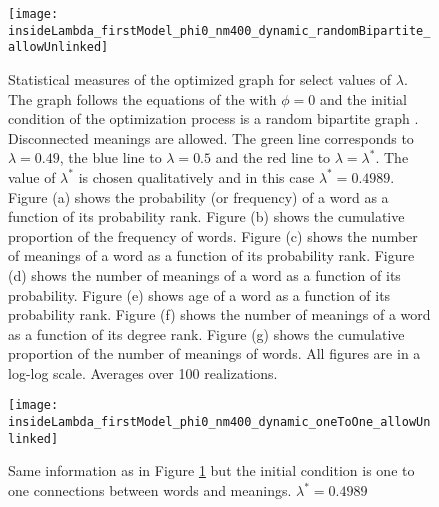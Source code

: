 \begin{figure}
  \centering
  \texttt{[image: insideLambda\_firstModel\_phi0\_nm400\_dynamic\_randomBipartite\_allowUnlinked]}
  \caption{
    Statistical measures of the optimized graph for select values of $\lambda$.
    The graph follows the equations of the \firstmodel{} with $\phi=0$ and the initial condition of the optimization process is a random bipartite graph . Disconnected meanings are allowed.
    The green line corresponds to $\lambda=0.49$, the blue line to $\lambda=0.5$ and the red line to $\lambda=\lambda^*$.
    The value of $\lambda^*$ is chosen qualitatively and in this case $\lambda^*=0.4989$.
    Figure (a) shows the probability (or frequency) of a word as a function of its probability rank.
    Figure (b) shows the cumulative proportion of the frequency of words.
    Figure (c) shows the number of meanings of a word as a function of its probability rank.
    Figure (d) shows the number of meanings of a word as a function of its probability.
    Figure (e) shows age of a word as a function of its probability rank.
    Figure (f) shows the number of meanings of a word as a function of its degree rank.
    Figure (g) shows the cumulative proportion of the number of meanings of words.
    All figures are in a log-log scale.
    Averages over 100 realizations.
  }
  \label{fig:insideLambda_firstModel_phi0_nm400_dynamic_randomBipartite_allowUnlinked}
\end{figure}

\begin{figure}
  \centering
  \texttt{[image: insideLambda\_firstModel\_phi0\_nm400\_dynamic\_oneToOne\_allowUnlinked]}
  \caption{Same information as in Figure \ref{fig:insideLambda_firstModel_phi0_nm400_dynamic_randomBipartite_allowUnlinked} but the initial condition is one to one connections between words and meanings. $\lambda^* = 0.4989$}
  \label{fig:insideLambda_firstModel_phi0_nm400_dynamic_oneToOne_allowUnlinked}
\end{figure}

